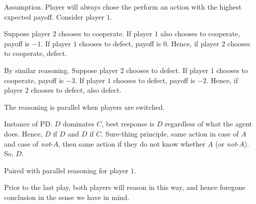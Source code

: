 \begin{note}
  Assumption.
  Player will always chose the perform an action with the highest expected payoff.
  Consider player \(1\).

  Suppose player \(2\) chooses to cooperate.
  If player \(1\) also chooses to cooperate, payoff is \(-1\).
  If player \(1\) chooses to defect, payoff is \(0\).
  Hence, if player \(2\) chooses to cooperate, defect.

  By similar reasoning.
  Suppose player \(2\) chooses to defect.
  If player \(1\) chooses to cooperate, payoff is \(-3\).
  If player \(1\) chooses to defect, payoff is \(-2\).
  Hence, if player \(2\) chooses to defect, also defect.

  The reasoning is parallel when players are switched.

  Instance of PD.
  \(D\) dominates \(C\), best response is \(D\) regardless of what the agent does.
  Hence, \(D\) if \(D\) and \(D\) if \(C\).
  Sure-thing principle, same action in case of \(A\) and case of \emph{not}-\(A\), then same action if they do not know whether \(A\) (or \emph{not}-\(A\)).
  So, \(D\).

  Paired with parallel reasoning for player \(1\).

  Prior to the last play, both players will reason in this way, and hence foregone conclusion in the sense we have in mind.

  
\end{note}


\section{}
\label{cha:sec:fcs-def}

